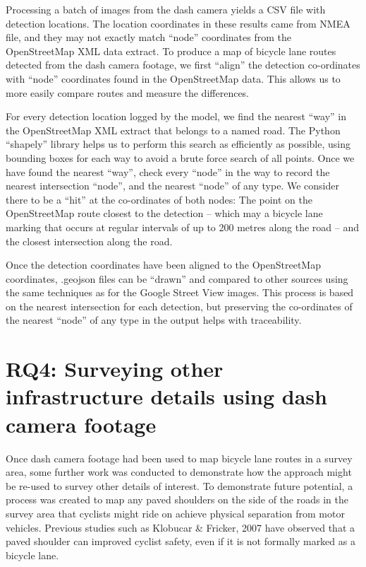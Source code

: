 \documentclass[11pt,twoside]{report}
\begin{document}
Processing a batch of images from the dash camera yields a CSV file with detection locations.  The location coordinates in these results came from NMEA file, and they may not exactly match ``node'' coordinates from the OpenStreetMap XML data extract.  To produce a map of bicycle lane routes detected from the dash camera footage, we first ``align'' the detection co-ordinates with ``node'' coordinates found in the OpenStreetMap data.  This allows us to more easily compare routes and measure the differences.

For every detection location logged by the model, we find the nearest ``way'' in the OpenStreetMap XML extract that belongs to a named road.  The Python ``shapely'' library helps us to perform this search as efficiently as possible, using bounding boxes for each way to avoid a brute force search of all points.  Once we have found the nearest ``way'', check every ``node'' in the way to record the nearest intersection ``node'', and the nearest ``node'' of any type.  We consider there to be a ``hit'' at the co-ordinates of both nodes:  The point on the OpenStreetMap route closest to the detection -- which may a bicycle lane marking that occurs at regular intervals of up to 200 metres along the road \cite{standards} -- and the closest intersection along the road.

Once the detection coordinates have been aligned to the OpenStreetMap coordinates, .geojson files can be ``drawn'' and compared to other sources using the same techniques as for the Google Street View images.  This process is based on the nearest intersection for each detection, but preserving the co-ordinates of the nearest ``node'' of any type in the output helps with traceability.


\section{RQ4: Surveying other infrastructure details using dash camera footage}

Once dash camera footage had been used to map bicycle lane routes in a survey area, some further work was conducted to demonstrate how the approach might be re-used to survey other details of interest.  To demonstrate future potential, a process was created to map any paved shoulders on the side of the roads in the survey area that cyclists might ride on achieve physical separation from motor vehicles.  Previous studies such as Klobucar \& Fricker, 2007 \cite{BIKESAFETY} have observed that a paved shoulder can improved cyclist safety, even if it is not formally marked as a bicycle lane.
\end{document}
